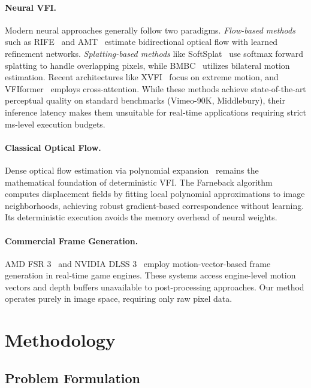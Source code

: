 \documentclass{article}
\begin{document}
\paragraph{Neural VFI.} Modern neural approaches generally follow two paradigms. \textit{Flow-based methods} such as RIFE~\cite{huang2022rife} and AMT~\cite{li2023amt} estimate bidirectional optical flow with learned refinement networks. \textit{Splatting-based methods} like SoftSplat~\cite{niklaus2020softsplat} use softmax forward splatting to handle overlapping pixels, while BMBC~\cite{park2020bmbc} utilizes bilateral motion estimation. Recent architectures like XVFI~\cite{sim2021xvfi} focus on extreme motion, and VFIformer~\cite{shi2022vfiformer} employs cross-attention. While these methods achieve state-of-the-art perceptual quality on standard benchmarks (Vimeo-90K, Middlebury), their inference latency makes them unsuitable for real-time applications requiring strict ms-level execution budgets.

\paragraph{Classical Optical Flow.} Dense optical flow estimation via polynomial expansion~\cite{farneback2003two} remains the mathematical foundation of deterministic VFI. The Farneback algorithm computes displacement fields by fitting local polynomial approximations to image neighborhoods, achieving robust gradient-based correspondence without learning. Its deterministic execution avoids the memory overhead of neural weights.

\paragraph{Commercial Frame Generation.} AMD FSR 3~\cite{amd2023fsr3} and NVIDIA DLSS 3~\cite{nvidia2022dlss3} employ motion-vector-based frame generation in real-time game engines. These systems access engine-level motion vectors and depth buffers unavailable to post-processing approaches. Our method operates purely in image space, requiring only raw pixel data.

\section{Methodology}

\subsection{Problem Formulation}
\end{document}

